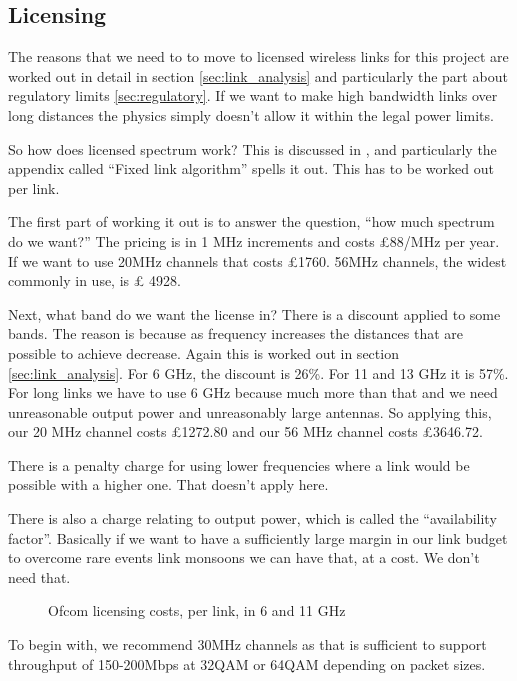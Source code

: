 \subsection{Licensing}

The reasons that we need to to move to licensed wireless links for
this project are worked out in detail in section
\ref{sec:link_analysis} and particularly the part about regulatory
limits \ref{sec:regulatory}. If we want to make high bandwidth links
over long distances the physics simply doesn't allow it within the
legal power limits.

So how does licensed spectrum work? This is discussed in
\cite{OfcomSpectrum}, and particularly the appendix called ``Fixed
link algorithm'' spells it out. This has to be worked out per link.

The first part of working it out is to answer the question, ``how much
spectrum do we want?'' The pricing is in 1 MHz increments and costs
£88/MHz per year. If we want to use 20MHz channels that costs
\pounds 1760. 56MHz channels, the widest commonly in use, is \pounds 
4928.

Next, what band do we want the license in? There is a discount applied
to some bands. The reason is because as frequency increases the
distances that are possible to achieve decrease. Again this is worked
out in section \ref{sec:link_analysis}. For 6 GHz, the discount is
26\%. For 11 and 13 GHz it is 57\%. For long links we have to use 6
GHz because much more than that and we need unreasonable output power
and unreasonably large antennas. So applying this, our 20 MHz channel
costs \pounds 1272.80 and our 56 MHz channel costs \pounds 3646.72.

There is a penalty charge for using lower frequencies where a link
would be possible with a higher one. That doesn't apply here.

There is also a charge relating to output power, which is called the
``availability factor''. Basically if we want to have a sufficiently
large margin in our link budget to overcome rare events link monsoons
we can have that, at a cost. We don't need that.

\begin{figure}[h]
  \begin{center}
    
  \end{center}
  \caption{Ofcom licensing costs, per link, in 6 and 11 GHz}
  \label{fig:license_costs}
\end{figure}

To begin with, we recommend 30MHz channels as that is sufficient to
support throughput of 150-200Mbps at 32QAM or 64QAM depending on
packet sizes.
